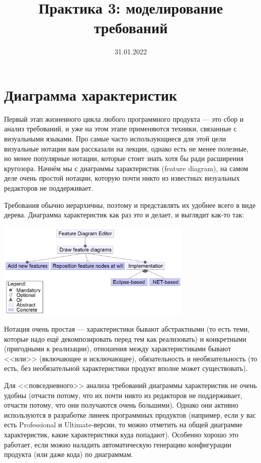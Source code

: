 \documentclass[a5paper]{article}
\title{Практика 3: моделирование требований}
\date{31.01.2022}
\begin{document}
\maketitle
\thispagestyle{empty}

\section{Диаграмма характеристик}

Первый этап жизненного цикла любого программного продукта --- это сбор и анализ требований, и уже на этом этапе применяются техники, связанные с визуальными языками. Про самые часто использующиеся для этой цели визуальные нотации вам рассказали на лекции, однако есть не менее полезные, но менее популярные нотации, которые стоит знать хотя бы ради расширения кругозора. Начнём мы с диаграммы характеристик (feature diagram), на самом деле очень простой нотации, которую почти никто из известных визуальных редакторов не поддерживает.

Требования обычно иерархичны, поэтому и представлять их удобнее всего в виде дерева. Диаграмма характеристик как раз это и делает, и выглядит как-то так:

\begin{center}
    \includegraphics[width=0.7\textwidth]{featureDiagram.png}
\end{center}

Нотация очень простая --- характеристики бывают абстрактными (то есть теми, которые надо ещё декомпозировать перед тем как реализовать) и конкретными (пригодными к реализации), отношения между характеристиками бывают <<или>> (включающее и исключающее), обязательность и необязательность (то есть, без необязательной характеристики продукт вполне может существовать).

Для <<повседневного>> анализа требований диаграммы характеристик не очень удобны (отчасти потому, что их почти никто из редакторов не поддерживает, отчасти потому, что они получаются очень большими). Однако они активно используются в разработке линеек программных продуктов (например, если у вас есть Professional и Ultimate-версии, то можно отметить на общей диаграмме характеристик, какие характеристики куда попадают). Особенно хорошо это работает, если можно наладить автоматическую генерацию конфигурации продукта (или даже кода) по диаграммам.
\end{document}

